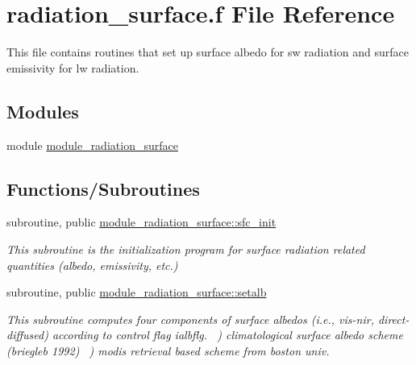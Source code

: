 \hypertarget{radiation__surface_8f}{}\section{radiation\+\_\+surface.\+f File Reference}
\label{radiation__surface_8f}


This file contains routines that set up surface albedo for sw radiation and surface emissivity for lw radiation.  


\subsection*{Modules}
\begin{DoxyCompactItemize}
\item 
module \hyperlink{namespacemodule__radiation__surface}{module\+\_\+radiation\+\_\+surface}
\end{DoxyCompactItemize}
\subsection*{Functions/\+Subroutines}
\begin{DoxyCompactItemize}
\item 
subroutine, public \hyperlink{group__module__radiation__surface_gaeb08607a27653edcaca756366feff0c0}{module\+\_\+radiation\+\_\+surface\+::sfc\+\_\+init}
\begin{DoxyCompactList}\small\item\em This subroutine is the initialization program for surface radiation related quantities (albedo, emissivity, etc.) \end{DoxyCompactList}\end{DoxyCompactItemize}
{\bf }\par
\begin{DoxyCompactItemize}
\item 
subroutine, public \hyperlink{group__module__radiation__surface_ga0db1853de27009e91e016ca940839001}{module\+\_\+radiation\+\_\+surface\+::setalb}
\begin{DoxyCompactList}\small\item\em This subroutine computes four components of surface albedos (i.\+e., vis-\/nir, direct-\/diffused) according to control flag ialbflg. ~) climatological surface albedo scheme (briegleb 1992) ~) modis retrieval based scheme from boston univ. \end{DoxyCompactList}\end{DoxyCompactItemize}

